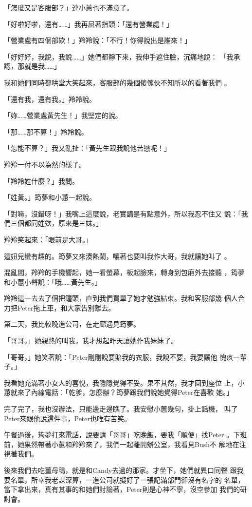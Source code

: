 「怎麼又是客服部？」連小蕙也不滿意了。

「好啦好啦，還有……」我再屈著指頭：「還有營業處！」

「營業處有四個部欸！」羚羚說：「不行！你得說出是誰來！」

「好好好，我說，我說……」她們都靜下來，我伸手遮住臉，沉痛地說：
「我承認，那就是我……」

我和她們同時都哄堂大笑起來，客服部的幾個傻傢伙不知所以的看著我們
。

「還有我，還有我。」羚羚說。

「妳……營業處黃先生！」我堅定的說。

「那……那不算！」羚羚說。

「怎能不算？」我又亂扯：「黃先生跟我說他苦戀呢！」

羚羚一付不以為然的樣子。

「羚羚姓什麼？」我問。

「姓黃。」筠夢和小蕙一起說。

「對嘛，沒錯呀！」我嘴上這麼說，老實講是有點意外，所以我忍不住又
說：「我們三個都同姓欸，原來是三妹。」

羚羚笑起來：「眼前是大哥。」

這妞兒蠻有趣的。筠夢又來湊熱鬧，嚷著也要叫我作大哥，我就讓她叫了
。

混亂間，羚羚的手機響起，她一看螢幕，板起臉來，轉身到包廂外去接聽
，筠夢和小蕙小聲說：「哦……黃先生。」

羚羚這一去去了個把鐘頭，直到我們買單了她才勉強結束。我和客服部幾
個人合力把Peter拖上車，和大家告別離去。

第二天，我比較晚進公司，在走廊遇見筠夢。

「哥哥。」她親熱的叫我，我才想起昨天讓她作我妹妹了。

「哥哥，」她笑著說：「Peter剛剛說要賠我的衣服，我說不要，我要讓他
愧疚一輩子。」

我看她充滿著小女人的喜悅，我隱隱覺得不妥。果不其然，我才回到座位
上，小蕙就來了內線電話：「乾爹，怎麼辦？筠夢跟我們說她覺得Peter在喜歡
她。」

完了完了，我也沒辦法，只能邊走邊瞧了。我安慰小蕙幾句，掛上話機，
叫了Peter來跟他說這件事，Peter也唯有苦笑。

午餐過後，筠夢打來電話，說要請「哥哥」吃晚飯，要我「順便」找Peter
。下班前，她果然帶著小蕙和羚羚來了，我們一起離開辦公室，我看見Bush不
解地在注視著我們。

後來我們去吃薑母鴨，就是和Candy去過的那家。才坐下，她們就異口同聲
跟我要名單，所幸我老謀深算，一進公司就擬好了一張記滿部門卻沒有名字的
名單，當下拿出來，真有其事的和她們討論著，Peter則是心神不寧，沒空參加
我們的研討會。

